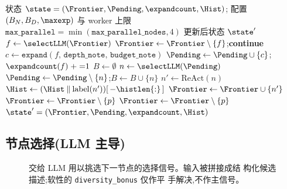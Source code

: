 \begin{algorithm}[t]
\small
\caption{BFTS run-loop(单次外层迭代)。}
\label{alg:bfts-run-loop}
\begin{algorithmic}[1]
\Require 状态 $\state=(\Frontier,\Pending,\expandcount,\Hist)$;
         配置 $(B_N, B_D, \maxexp)$ 与 worker 上限
         $\texttt{max\_parallel}=\min(\texttt{max\_parallel\_nodes},4)$
\Ensure  更新后状态 $\state'$
\State {}
  \State $f \gets \selectLLM(\Frontier)$ 
    \State $\Frontier \gets \Frontier \setminus \{f\}$;\;\;\textbf{continue}
  \EndIf
  \State $c \gets \texttt{expand}(f,\,\texttt{depth\_note},\,\texttt{budget\_note})$
  \State $\Pending \gets \Pending \cup \{c\}$;\;\;$\expandcount(f) \mathrel{+}{=} 1$
\EndWhile
\State {}
\State $B \gets \emptyset$
  \State $n \gets \selectLLM(\Pending)$ 
  \State $\Pending \gets \Pending \setminus \{n\}$;\;\;$B \gets B \cup \{n\}$
\EndWhile
{}
  \State $n' \gets \mathrm{ReAct}(n)$ 
  \State $\Hist \gets (\Hist \mathbin{\Vert} \mathrm{label}(n'))[\,-\histlen{:}\,]$ 
  \State $\Frontier \gets \Frontier \cup \{n'\}$
   
      \State $\Frontier \gets \Frontier \setminus \{p\}$
    \EndIf
  \EndFor
   
      \State $\Frontier \gets \Frontier \setminus \{p\}$
    \EndIf
  \EndFor
\EndFor
\State \Return $\state' = (\Frontier,\Pending,\expandcount,\Hist)$
\end{algorithmic}
\end{algorithm}

\subsection{节点选择(LLM 主导)}\label{sec:exploration:node-selection}

\begin{figure}[t]
  \centering
  \resizebox{\columnwidth}{!}{}
  \caption{交给 LLM 用以挑选下一节点的选择信号。输入被拼接成结
           构化候选描述;软性的 \texttt{diversity\_bonus} 仅作平
           手解决,不作主信号。}
  \label{fig:nodescore}
\end{figure}

